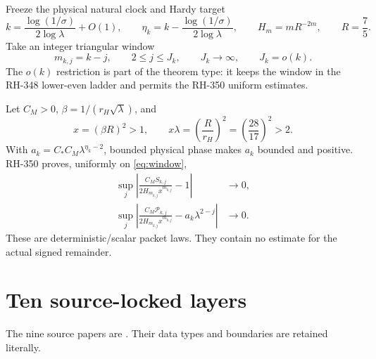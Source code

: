 \documentclass[11pt]{article}
\theoremstyle{definition}
\theoremstyle{remark}
\newcommand{\cP}{\mathcal P}
\begin{document}
Freeze the physical natural clock and Hardy target
\begin{equation}\label{eq:clock}
 k=\frac{\log(1/\sigma)}{2\log\lambda}+O(1),
 \qquad
 \eta_k=k-\frac{\log(1/\sigma)}{2\log\lambda},
 \qquad
 H_m=mR^{-2m},
 \qquad R=\frac75.
\end{equation}
Take an integer triangular window
\begin{equation}\label{eq:window}
 m_{k,j}=k-j,
 \qquad 2\le j\le J_k,
 \qquad J_k\longrightarrow\infty,
 \qquad J_k=o(k).
\end{equation}
The $o(k)$ restriction is part of the theorem type: it keeps the window in
the RH-348 lower-even ladder and permits the RH-350 uniform estimates.

Let $C_M>0$, $\beta=1/(r_H\sqrt\lambda)$, and
\begin{equation}\label{eq:x}
 x=(\beta R)^2>1,
 \qquad
 x\lambda=\left(\frac{R}{r_H}\right)^2
 =\left(\frac{28}{17}\right)^2>2.
\end{equation}
With $a_k=C_*C_M\lambda^{\eta_k-2}$, bounded physical phase makes $a_k$
bounded and positive.  RH-350 proves, uniformly on \eqref{eq:window},
\begin{align}
 \sup_j\left|
 \frac{C_MS_{k,j}}{2H_{m_{k,j}}x^{m_{k,j}}}-1
 \right|&\longrightarrow0,
 \label{eq:S-uniform}\\
 \sup_j\left|
 \frac{C_M\cP_{k,j}}{2H_{m_{k,j}}x^{m_{k,j}}}
 -a_k\lambda^{2-j}
 \right|&\longrightarrow0.
 \label{eq:P-uniform}
\end{align}
These are deterministic/scalar packet laws.  They contain no estimate for
the actual signed remainder.

\section{Ten source-locked layers}

The nine source papers are
\citep{WangRankLock2026,WangEqualInvariant2026,WangCriticalOrbit2026,
WangCriticalPhase2026,WangLowerOrbit2026,WangLowerBalance2026,
WangLowerLadder2026,WangTwoSidebands2026,WangGrowingSidebands2026}.
Their data types and boundaries are retained literally.
\end{document}
